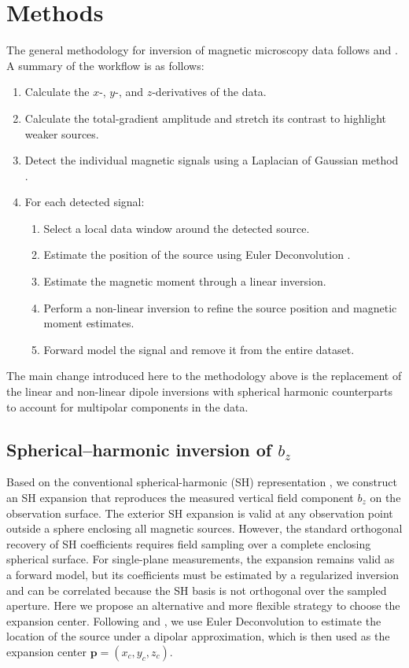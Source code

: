 \section{Methods}

The general methodology for inversion of magnetic microscopy data follows \citet{Souza-Junior2024} and \citet{SouzaJunior2026}. A summary of the workflow is as follows:

\begin{enumerate}
    \item Calculate the $x$-, $y$-, and $z$-derivatives of the data.
    \item Calculate the total-gradient amplitude \citep{Blakely1996} and stretch its contrast to highlight weaker sources.
    \item Detect the individual magnetic signals using a Laplacian of Gaussian method \citep{Kong2013}.
    \item For each detected signal:
    \begin{enumerate}
        \item Select a local data window around the detected source.
        \item Estimate the position of the source using Euler Deconvolution \citep{Reid1990}.
        \item Estimate the magnetic moment through a linear inversion.
        \item Perform a non-linear inversion to refine the source position and magnetic moment estimates.
        \item Forward model the signal and remove it from the entire dataset.
    \end{enumerate}
\end{enumerate}

The main change introduced here to the methodology above is the replacement of the linear and non-linear dipole inversions with spherical harmonic counterparts to account for multipolar components in the data.

\subsection{Spherical–harmonic inversion of $b_z$}

Based on the conventional spherical-harmonic (SH) representation \citep{Lima2023}, we construct an SH expansion that reproduces the measured vertical field component $b_z$ on the observation surface. The exterior SH expansion is valid at any observation point outside a sphere enclosing all magnetic sources. However, the standard orthogonal recovery of SH coefficients requires field sampling over a complete enclosing spherical surface. For single-plane measurements, the expansion remains valid as a forward model, but its coefficients must be estimated by a regularized inversion and can be correlated because the SH basis is not orthogonal over the sampled aperture. Here we propose an alternative and more flexible strategy to choose the expansion center. Following \citet{Souza-Junior2024} and \citet{SouzaJunior2026}, we use Euler Deconvolution \citep{Reid1990} to estimate the location of the source under a dipolar approximation, which is then used as the expansion center $\mathbf{p} = (x_c, y_c, z_c)$.

